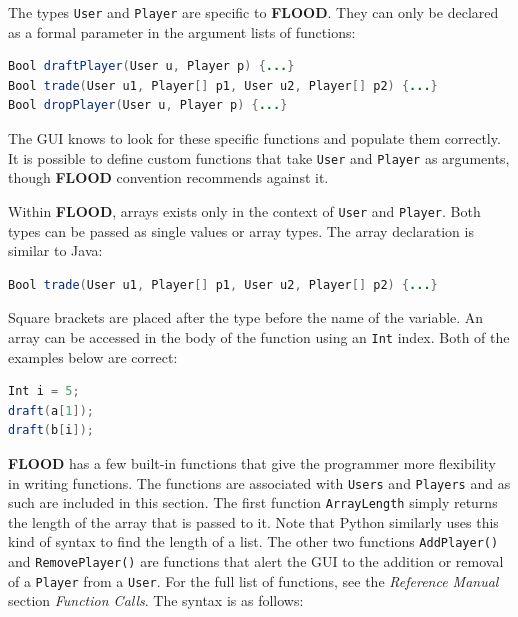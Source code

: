 \documentclass[12pt]{report}
\begin{document}
The types \texttt{User} and \texttt{Player} are specific to \textbf{FLOOD}. They can only be declared as a formal parameter in the argument lists of functions:

\begin{singlespace}
\begin{lstlisting}[language=Java,label=some-code,caption={\texttt{User} and \texttt{Player} declared in function argument list}]
Bool draftPlayer(User u, Player p) {...}
Bool trade(User u1, Player[] p1, User u2, Player[] p2) {...}
Bool dropPlayer(User u, Player p) {...}
\end{lstlisting}
\end{singlespace}

The GUI knows to look for these specific functions and populate them correctly. It is possible to define custom functions that take \texttt{User} and \texttt{Player} as arguments, though \textbf{FLOOD} convention recommends against it. 

Within \textbf{FLOOD}, arrays exists only in the context of \texttt{User} and \texttt{Player}. Both types can be passed as single values or array types. The array declaration is similar to Java:

\begin{singlespace}
\begin{lstlisting}[language=Java,label=some-code,caption={Passing \texttt{User} and \texttt{Player} arrays}]
Bool trade(User u1, Player[] p1, User u2, Player[] p2) {...}
\end{lstlisting}
\end{singlespace}

Square brackets are placed after the type before the name of the variable. An array can be accessed in the body of the function using an \texttt{Int} index. Both of the examples below are correct:

\begin{singlespace}
\begin{lstlisting}[language=Java,label=some-code,caption={Assessing array elements using index.}]
Int i = 5;
draft(a[1]);
draft(b[i]);
\end{lstlisting}
\end{singlespace}

\textbf{FLOOD} has a few built-in functions that give the programmer more flexibility in writing functions. The functions are associated with \texttt{Users} and \texttt{Players} and as such are included in this section. The first function \texttt{ArrayLength} simply returns the length of the array that is passed to it. Note that Python similarly uses this kind of syntax to find the length of a list. The other two functions \texttt{AddPlayer()} and \texttt{RemovePlayer()} are functions that alert the GUI to the addition or removal of a \texttt{Player} from a \texttt{User}. For the full list of functions, see the \textit{Reference Manual} section \textit{Function Calls}. The syntax is as follows:
\end{document}

